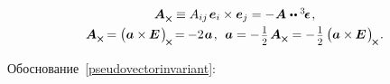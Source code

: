 \begin{otherlanguage}{russian}
\nopagebreak\vspace{-0.15em}\begin{equation}\label{pseudovectorinvariant}
\begin{array}{c}
\bm{A}_{\Xcompanion} \equiv A_{ij} \hspace{.25ex} \bm{e}_i \times \bm{e}_j = - \hspace{0.1ex} \bm{A} \hspace{0.1ex} \dotdotp \levicivitatensor
\hspace{.2ex}, \\[.3em]
%
\bm{A}_{\Xcompanion} \hspace{-0.16ex} = \left(^{\mathstrut} \hspace{-0.1ex} \bm{a} \times\hspace{-0.1ex} \bm{E} \hspace{.2ex} \right)_{\hspace{-0.25ex}\Xcompanion} \hspace{-0.25ex} = \hspace{-0.12ex}
- 2 \hspace{0.16ex} \bm{a} \hspace{.2ex},\:\:
\bm{a} = - \hspace{.2ex} \smalldisplaystyleonehalf \hspace{.25ex} \bm{A}_{\Xcompanion} = - \hspace{.2ex} \smalldisplaystyleonehalf \left(^{\mathstrut} \hspace{-0.1ex} \bm{a} \times\hspace{-0.1ex} \bm{E} \hspace{.2ex} \right)_{\hspace{-0.25ex}\Xcompanion} \hspace{-0.2ex}.
\end{array}
\end{equation}

Обоснование~\eqref{pseudovectorinvariant}:


\end{otherlanguage}
